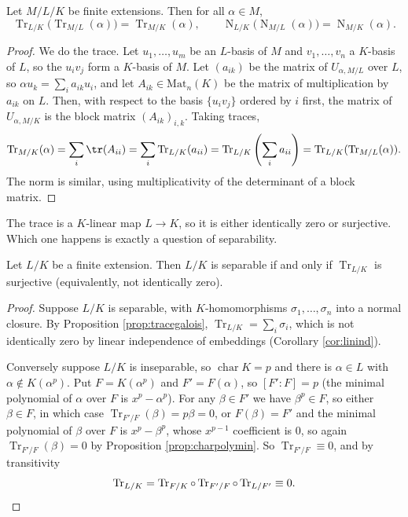 \documentclass[a4paper]{scrartcl}
\newcommand{\charr}{\operatorname{char}}
\newcommand{\Tr}{\operatorname{Tr}}
\newcommand{\Nm}{\operatorname{N}}
\begin{document}
\begin{proposition}[Transitivity]
	Let $M/L/K$ be finite extensions. Then for all $\alpha \in M$,
	$$\Tr_{L/K}\big(\Tr_{M/L}(\alpha)\big) = \Tr_{M/K}(\alpha), \qquad \Nm_{L/K}\big(\Nm_{M/L}(\alpha)\big) = \Nm_{M/K}(\alpha).$$
\end{proposition}

\begin{proof}
	We do the trace. Let $u_1,\dots,u_m$ be an $L$-basis of $M$ and $v_1,\dots,v_n$ a $K$-basis of $L$, so the $u_iv_j$ form a $K$-basis of $M$. Let $(a_{ik})$ be the matrix of $U_{\alpha, M/L}$ over $L$, so $\alpha u_k = \sum_i a_{ik}u_i$, and let $A_{ik}\in\mathrm{Mat}_n(K)$ be the matrix of multiplication by $a_{ik}$ on $L$. Then, with respect to the basis $\{u_iv_j\}$ ordered by $i$ first, the matrix of $U_{\alpha,M/K}$ is the block matrix $(A_{ik})_{i,k}$. Taking traces,
	$$\Tr_{M/K}(\alpha) = \sum_i \tr(A_{ii}) = \sum_i \Tr_{L/K}(a_{ii}) = \Tr_{L/K}\left(\sum_i a_{ii}\right) = \Tr_{L/K}(\Tr_{M/L}(\alpha)).$$
	The norm is similar, using multiplicativity of the determinant of a block matrix.
\end{proof}

The trace is a $K$-linear map $L \to K$, so it is either identically zero or surjective. Which one happens is exactly a question of separability.

\begin{theorem}\label{thm:tracesurj}
	Let $L/K$ be a finite extension. Then $L/K$ is separable if and only if $\Tr_{L/K}$ is surjective (equivalently, not identically zero).
\end{theorem}

\begin{proof}
	Suppose $L/K$ is separable, with $K$-homomorphisms $\sigma_1,\dots,\sigma_n$ into a normal closure. By Proposition \ref{prop:tracegalois}, $\Tr_{L/K} = \sum_i\sigma_i$, which is not identically zero by linear independence of embeddings (Corollary \ref{cor:linind}).

	Conversely suppose $L/K$ is inseparable, so $\charr K = p$ and there is $\alpha \in L$ with $\alpha \notin K(\alpha^p)$. Put $F = K(\alpha^p) $ and $F' = F(\alpha)$, so $[F' : F] = p$ (the minimal polynomial of $\alpha$ over $F$ is $x^p - \alpha^p$). For any $\beta \in F'$ we have $\beta^p \in F$, so either $\beta \in F$, in which case $\Tr_{F'/F}(\beta) = p\beta = 0$, or $F(\beta) = F'$ and the minimal polynomial of $\beta$ over $F$ is $x^p-\beta^p$, whose $x^{p-1}$ coefficient is $0$, so again $\Tr_{F'/F}(\beta) = 0$ by Proposition \ref{prop:charpolymin}. So $\Tr_{F'/F} \equiv 0$, and by transitivity
	$$\Tr_{L/K} = \Tr_{F/K}\circ\Tr_{F'/F}\circ\Tr_{L/F'} \equiv 0. \qedhere$$
\end{proof}
\end{document}
